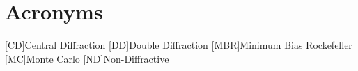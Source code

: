 \chapter{Acronyms}\label{chapter:acronyms}

\begin{acronym}[BRAHMS]
	[CD]{Central Diffraction}
	[DD]{Double Diffraction}
	[MBR]{Minimum Bias Rockefeller}
	[MC]{Monte Carlo}
	[ND]{Non-Diffractive}

\end{acronym}
